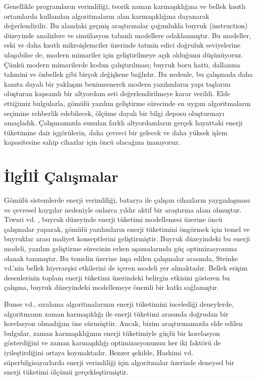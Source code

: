 \documentclass[conference, a4paper]{IEEEtran}
\begin{document}
Genellikle programların verimliliği, teorik zaman karmaşıklığına ve bellek kısıtlı ortamlarda kullanılan algoritmaların alan karmaşıklığına dayanarak değerlendirilir. Bu alandaki geçmiş araştırmalar çoğunlukla buyruk (instruction) düzeyinde analizlere ve simülasyon tabanlı modellere odaklanmıştır. Bu modeller, eski ve daha kısıtlı mikroişlemciler üzerinde tatmin edici doğruluk seviyelerine ulaşabilse de, modern mimariler için geliştirilmeye açık olduğunu düşünüyoruz. Çünkü modern mimarilerde kodun çalıştırılması; buyruk boru hattı, dallanma tahmini ve önbellek gibi birçok değişkene bağlıdır. Bu nedenle, bu çalışmada daha kanıta dayalı bir yaklaşım benimsenerek modern yazılımların yapı taşlarını oluşturan kapsamlı bir altyordam seti değerlendirilmeye karar verildi. Elde ettiğimiz bulgularla, gömülü yazılım geliştirme sürecinde en uygun algoritmaların seçimine rehberlik edebilecek, ölçüme dayalı bir bilgi deposu oluşturmayı amaçladık. Çalışmamızda sunulan farklı altyordamların gerçek hayattaki enerji tüketimine dair içgörülerin, daha çevreci bir gelecek ve daha yüksek işlem kapasitesine sahip cihazlar için öncü olacağına inanıyoruz.

\section{İlg{\footnotesize İ}l{\footnotesize İ} Çalışmalar}

Gömülü sistemlerde enerji verimliliği, batarya ile çalışan cihazların yaygınlaşması ve çevresel kaygılar nedeniyle onlarca yıldır aktif bir araştırma alanı olmuştur. Tiwari vd. \cite{tiwari-power-analysis}, buyruk düzeyinde enerji tüketimi modellemesi üzerine öncü çalışmalar yaparak, gömülü yazılımların enerji tüketimini öngörmek için temel ve buyruklar arası maliyet konseptlerini geliştirmiştir. Buyruk düzeyindeki bu enerji modeli, yazılım geliştirme sürecinin erken aşamalarında güç optimizasyonuna olanak tanımıştır. Bu temelin üzerine inşa edilen çalışmalar arasında, Steinke vd.'nin \cite{steinke-instruction-level-energy-model} bellek hiyerarşisi etkilerini de içeren modeli yer almaktadır. Bellek erişim desenlerinin toplam enerji tüketimi üzerindeki belirgin etkisini gösteren bu çalışma, buyruk düzeyindeki modellemeye önemli bir katkı sağlamıştır.

Bunse vd.\cite{bunse-no-corr}, sıralama algoritmalarının enerji tüketimini incelediği deneylerde, algoritmanın zaman karmaşıklığı ile enerji tüketimi arasında doğrudan bir korelasyon olmadığını öne sürmüştür. Ancak, bizim araştırmamızda elde edilen bulgular, zaman karmaşıklığının enerji tüketimiyle güçlü bir korelasyon gösterdiğini ve zaman karmaşıklığı optimizasyonunun her iki faktörü de iyileştirdiğini ortaya koymaktadır. Benzer şekilde, Hashimi vd.\cite{hashimi-binary}\cite{hashimi-mergesort} süperbilgisayarlarda enerji verimliliği için algoritmalar üzerinde deneysel bir enerji tüketimi ölçümü gerçekleştirmiştir.
\end{document}
